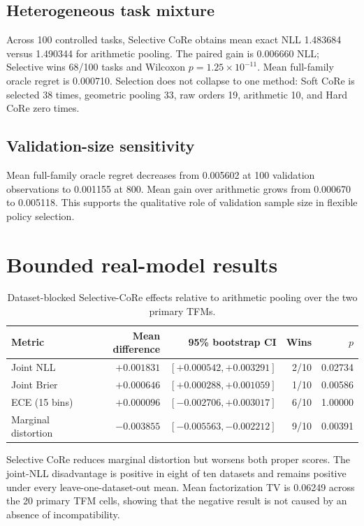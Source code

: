 \documentclass[pdflatex,sn-basic]{sn-jnl}
\theoremstyle{plain}
\begin{document}
\subsection{Heterogeneous task mixture}
Across 100 controlled tasks, Selective CoRe obtains mean exact NLL 1.483684 versus 1.490344 for arithmetic pooling. The paired gain is 0.006660 NLL; Selective wins 68/100 tasks and Wilcoxon $p=1.25\times10^{-11}$. Mean full-family oracle regret is 0.000710. Selection does not collapse to one method: Soft CoRe is selected 38 times, geometric pooling 33, raw orders 19, arithmetic 10, and Hard CoRe zero times.

\subsection{Validation-size sensitivity}
Mean full-family oracle regret decreases from 0.005602 at 100 validation observations to 0.001155 at 800. Mean gain over arithmetic grows from 0.000670 to 0.005118. This supports the qualitative role of validation sample size in flexible policy selection.

\section{Bounded real-model results}\label{sec:real}
\begin{table}[t]
\caption{Dataset-blocked Selective-CoRe effects relative to arithmetic pooling over the two primary TFMs.}
\centering
\begin{tabular}{lrrrr}
\toprule
Metric & Mean difference & 95\% bootstrap CI & Wins & $p$\\
\midrule
Joint NLL & $+0.001831$ & $[+0.000542,+0.003291]$ & 2/10 & 0.02734\\
Joint Brier & $+0.000646$ & $[+0.000288,+0.001059]$ & 1/10 & 0.00586\\
ECE (15 bins) & $+0.000096$ & $[-0.002706,+0.003017]$ & 6/10 & 1.00000\\
Marginal distortion & $-0.003855$ & $[-0.005563,-0.002212]$ & 9/10 & 0.00391\\
\bottomrule
\end{tabular}
\end{table}

Selective CoRe reduces marginal distortion but worsens both proper scores. The joint-NLL disadvantage is positive in eight of ten datasets and remains positive under every leave-one-dataset-out mean. Mean factorization TV is 0.06249 across the 20 primary TFM cells, showing that the negative result is not caused by an absence of incompatibility.
\end{document}
